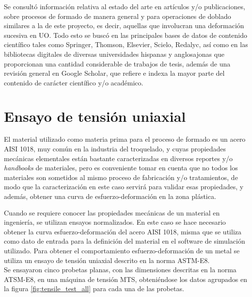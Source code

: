 Se consultó información relativa al estado del arte en artículos y/o publicaciones, 
sobre procesos de formado de manera general y para operaciones de doblado similares a la 
de este proyecto, es decir, aquellas que involucran una deformación sucesiva en UO. 
Todo esto se buscó en las principales bases de datos de contenido científico tales 
como Springer, Thomson, Elsevier, Scielo, Redalyc, así como en las bibliotecas 
digitales de diversas universidades hispanas y anglosajonas que proporcionan una 
cantidad considerable de trabajos de tesis, además de una revisión general en 
Google Scholar, que refiere e indexa la mayor parte del contenido de carácter científico 
y/o académico.

\section{Ensayo de tensión uniaxial}


El material utilizado como materia prima para el proceso de formado es un acero AISI 1018, 
muy común en la industria del troquelado, y cuyas propiedades mecánicas elementales están 
bastante caracterizadas en diversos reportes y/o \textit{handbooks} de materiales, pero 
es conveniente tomar en cuenta que no todos los materiales son sometidos al mismo proceso 
de fabricación y/o tratamientos, de modo que la caracterización en este caso servirá 
para validar esas propiedades, y además, obtener una curva de esfuerzo-deformación en la 
zona plástica.

Cuando se requiere conocer las propiedades mecánicas de un material en ingeniería, se utilizan ensayos 
normalizados. En este caso se hace necesario obtener la curva esfuerzo-deformación del 
acero AISI 1018, misma que se utiliza como dato de entrada para la definición del material 
en el software de simulación utilizado. Para obtener el comportamiento esfuerzo-deformación 
de un metal se utiliza un ensayo de tensión uniaxial descrito en la norma ASTM-E8. ~\cite{ASTME8} \\

Se ensayaron cinco probetas planas, con las dimensiones descritas en la norma ATSM-E8, en una 
máquina de tensión MTS, obteniéndose los datos agrupados en la figura \ref{fig:tensile_test_all} para 
cada una de las probetas.\\

